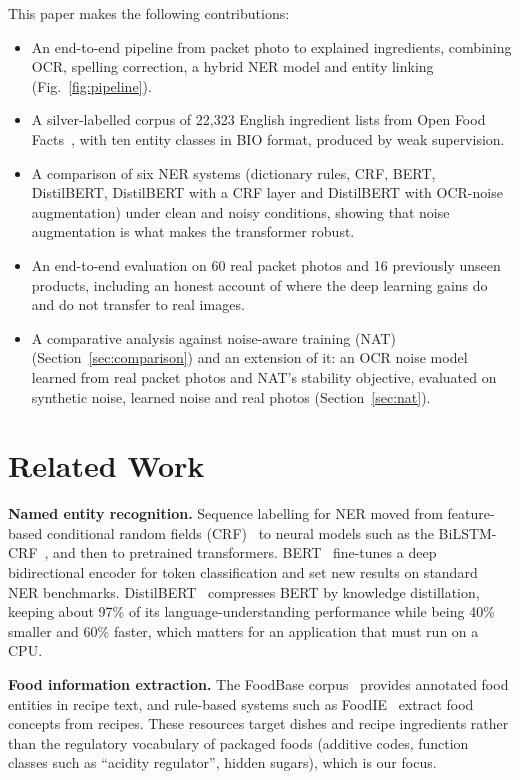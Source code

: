 \documentclass[conference]{IEEEtran}
\begin{document}
This paper makes the following contributions:
\begin{itemize}
\item An end-to-end pipeline from packet photo to explained ingredients, combining OCR, spelling correction, a hybrid NER model and entity linking (Fig.~\ref{fig:pipeline}).
\item A silver-labelled corpus of 22,323 English ingredient lists from Open Food Facts~\cite{off}, with ten entity classes in BIO format, produced by weak supervision.
\item A comparison of six NER systems (dictionary rules, CRF, BERT, DistilBERT, DistilBERT with a CRF layer and DistilBERT with OCR-noise augmentation) under clean and noisy conditions, showing that noise augmentation is what makes the transformer robust.
\item An end-to-end evaluation on 60 real packet photos and 16 previously unseen products, including an honest account of where the deep learning gains do and do not transfer to real images.
\item A comparative analysis against noise-aware training (NAT)~\cite{namysl2020nat} (Section~\ref{sec:comparison}) and an extension of it: an OCR noise model learned from real packet photos and NAT's stability objective, evaluated on synthetic noise, learned noise and real photos (Section~\ref{sec:nat}).
\end{itemize}

\section{Related Work}

\textbf{Named entity recognition.} Sequence labelling for NER moved from feature-based conditional random fields (CRF)~\cite{crf} to neural models such as the BiLSTM-CRF~\cite{huang2015bilstm,lample2016neural}, and then to pretrained transformers. BERT~\cite{bert} fine-tunes a deep bidirectional encoder for token classification and set new results on standard NER benchmarks. DistilBERT~\cite{distilbert} compresses BERT by knowledge distillation, keeping about 97\% of its language-understanding performance while being 40\% smaller and 60\% faster, which matters for an application that must run on a CPU.

\textbf{Food information extraction.} The FoodBase corpus~\cite{foodbase} provides annotated food entities in recipe text, and rule-based systems such as FoodIE~\cite{foodie} extract food concepts from recipes. These resources target dishes and recipe ingredients rather than the regulatory vocabulary of packaged foods (additive codes, function classes such as ``acidity regulator'', hidden sugars), which is our focus.
\end{document}
